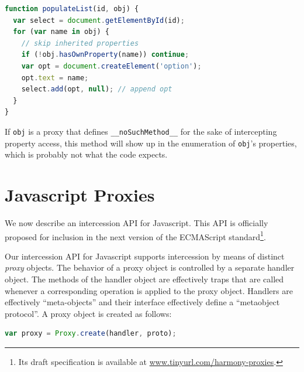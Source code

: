 \documentclass{sig-alternate}
\newcommand{\noSuchMethod}{\texttt{\_\_noSuchMethod\_\_}}
\begin{document}
\begin{lstlisting}[language=javascript]
function populateList(id, obj) {
  var select = document.getElementById(id);
  for (var name in obj) {
    // skip inherited properties
    if (!obj.hasOwnProperty(name)) continue;
    var opt = document.createElement('option');
    opt.text = name;
    select.add(opt, null); // append opt
  }
}
\end{lstlisting}

If \texttt{obj} is a proxy that defines \noSuchMethod{} for the sake of intercepting property access, this method will show up in the enumeration of \texttt{obj}'s properties, which is probably not what the code expects.


\section{Javascript Proxies}
\label{sec:proxies_for_javascript}

We now describe an intercession API for Javascript. This API is officially proposed for inclusion in the next version of the ECMAScript standard\footnote{Its draft specification is available at \url{www.tinyurl.com/harmony-proxies}.}.

Our intercession API for Javascript supports intercession by means of distinct \emph{proxy} objects. The behavior of a proxy object is controlled by a separate handler object. The methods of the handler object are effectively traps that are called whenever a corresponding operation is applied to the proxy object. Handlers are effectively ``meta-objects'' and their interface effectively define a ``metaobject protocol''. A proxy object is created as follows:

\begin{lstlisting}[language=javascript]
var proxy = Proxy.create(handler, proto);
\end{lstlisting}
\end{document}
